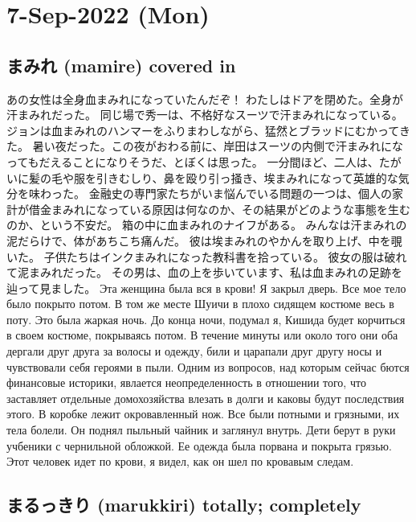 \section{7-Sep-2022 (Mon)}
\subsection{まみれ (mamire)  covered in}

あの女性は全身血まみれになっていたんだぞ！
わたしはドアを閉めた。全身が汗まみれだった。
同じ場で秀一は、不格好なスーツで汗まみれになっている。
ジョンは血まみれのハンマーをふりまわしながら、猛然とブラッドにむかってきた。
暑い夜だった。この夜がおわる前に、岸田はスーツの内側で汗まみれになってもだえることになりそうだ、とぼくは思った。
一分間ほど、二人は、たがいに髪の毛や服を引きむしり、鼻を殴り引っ掻き、埃まみれになって英雄的な気分を味わった。
金融史の専門家たちがいま悩んでいる問題の一つは、個人の家計が借金まみれになっている原因は何なのか、その結果がどのような事態を生むのか、という不安だ。
箱の中に血まみれのナイフがある。
みんなは汗まみれの泥だらけで、体があちこち痛んだ。
彼は埃まみれのやかんを取り上げ、中を覗いた。
子供たちはインクまみれになった教科書を拾っている。
彼女の服は破れて泥まみれだった。
その男は、血の上を歩いています、私は血まみれの足跡を辿って見ました。
Эта женщина была вся в крови!
Я закрыл дверь. Все мое тело было покрыто потом.
В том же месте Шуичи в плохо сидящем костюме весь в поту.
Это была жаркая ночь. До конца ночи, подумал я, Кишида будет корчиться в своем костюме, покрываясь потом.
В течение минуты или около того они оба дергали друг друга за волосы и одежду, били и царапали друг другу носы и чувствовали себя героями в пыли.
Одним из вопросов, над которым сейчас бются финансовые историки, явлается неопределенность в отношении того, что заставляет отдельные домохозяйства влезать в долги и каковы будут последствия этого.
В коробке лежит окровавленный нож.
Все были потными и грязными, их тела болели.
Он поднял пыльный чайник и заглянул внутрь.
Дети берут в руки учбеники с чернильной обложкой.
Ее одежда была порвана и покрыта грязью.
Этот человек идет по крови, я видел, как он шел по кровавым следам.

\subsection{まるっきり (marukkiri) totally; completely}

